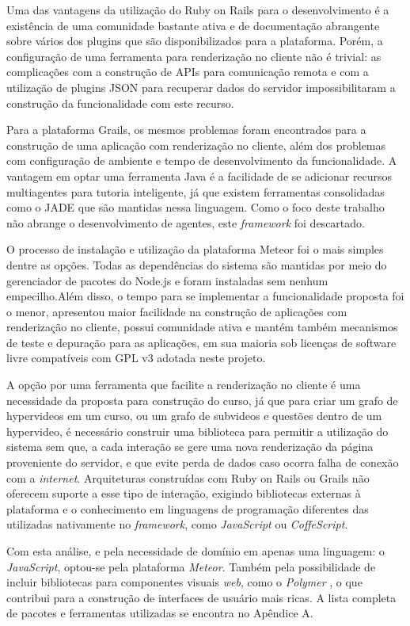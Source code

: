 Uma das vantagens da utilização do Ruby on Rails para o desenvolvimento é a existência de uma comunidade bastante ativa e de documentação abrangente sobre vários dos plugins que são disponibilizados para a plataforma. Porém, a configuração de uma ferramenta para renderização no cliente não é trivial: as complicações com a construção de APIs para comunicação remota e com a utilização de plugins JSON para recuperar dados do servidor impossibilitaram a construção da funcionalidade com este recurso.

Para a plataforma Grails, os mesmos problemas foram encontrados para a construção de uma aplicação com renderização no cliente, além dos problemas com configuração de ambiente e tempo de desenvolvimento da funcionalidade. A vantagem em optar uma ferramenta Java é a facilidade de se adicionar recursos multiagentes para tutoria inteligente, já que existem ferramentas consolidadas como o JADE \cite{jade2015} que são mantidas nessa linguagem. Como o foco deste trabalho não abrange o desenvolvimento de agentes, este \textit{framework} foi descartado.

O processo de instalação e utilização da plataforma Meteor foi o mais simples dentre as opções. Todas as dependências do sistema são mantidas por meio do gerenciador de pacotes do Node.js \cite{nodejs2015} e foram instaladas sem nenhum empecilho.Além disso, o tempo para se implementar a funcionalidade proposta foi o menor, apresentou maior facilidade na construção de aplicações com renderização no cliente, possui comunidade ativa e mantém também mecanismos de teste e depuração para as aplicações, em sua maioria sob licenças de software livre compatíveis com GPL v3 adotada neste projeto.

A opção por uma ferramenta que facilite a renderização no cliente é uma necessidade da proposta para construção do curso, já que para criar um grafo de hypervideos em um curso, ou um grafo de subvideos e questões dentro de um hypervideo, é necessário construir uma biblioteca para permitir a utilização do sistema sem que, a cada interação se gere uma nova renderização da página proveniente do servidor, e que evite perda de dados caso ocorra falha de conexão com a \textit{internet}. Arquiteturas construídas com Ruby on Rails ou Grails não oferecem suporte a esse tipo de interação, exigindo bibliotecas externas à plataforma e o conhecimento em linguagens de programação diferentes das utilizadas nativamente no \textit{framework}, como \textit{JavaScript} ou \textit{CoffeScript}.

Com esta análise, e pela necessidade de domínio em apenas uma linguagem: o \textit{JavaScript}, optou-se pela plataforma \textit{Meteor}. Também pela possibilidade de incluir bibliotecas para componentes visuais \textit{web}, como o \textit{Polymer} \cite{polymer2015}, o que contribui para a construção de interfaces de usuário mais ricas. A lista completa de pacotes e ferramentas utilizadas se encontra no Apêndice A.

